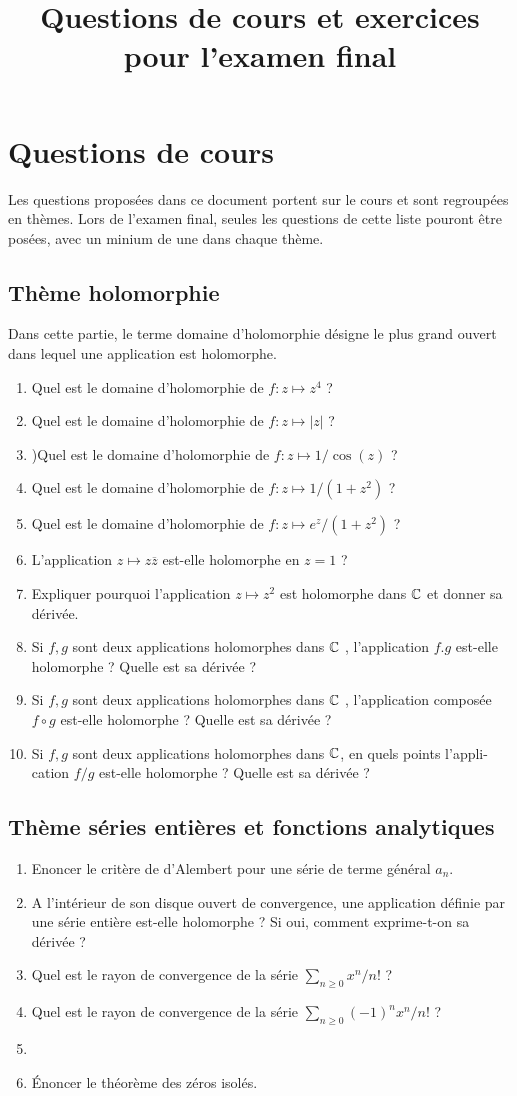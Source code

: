 \documentclass[a4paper, 12pt]{amsart}
\title{Questions de cours et exercices pour l'examen final}
\begin{document}
\maketitle
\section{Questions de cours}
Les questions proposées dans ce document portent sur le cours et sont regroupées en thèmes. Lors de l'examen final, seules les questions de cette liste pouront être
posées, avec un minium de une dans chaque thème.
\subsection{Thème holomorphie}
Dans cette partie, le terme domaine d'holomorphie désigne le plus grand ouvert
dans lequel une application est holomorphe.
\begin{enumerate}
\item Quel est le domaine d'holomorphie de $f : z \mapsto z^4$ ?
\item Quel est le domaine d'holomorphie de $f : z \mapsto |z|$ ?
\item)Quel est le domaine d'holomorphie de $f : z \mapsto 1/ \cos(z)$ ?
\item Quel est le domaine d'holomorphie de $f : z \mapsto 1/(1 + z^2 )$ ?
\item Quel est le domaine d'holomorphie de $f : z \mapsto e^z /(1 + z^2 )$ ?
\item L'application $z \mapsto z\overline{z}$ est-elle holomorphe en $z = 1$ ?
\item Expliquer pourquoi l'application $z \mapsto z^2$ est holomorphe dans $\mathbb{C}$ et donner
sa dérivée.
\item Si $f, g$ sont deux applications holomorphes dans $\mathbb{C}$ , l'application $f.g$ est-elle
holomorphe ? Quelle est sa dérivée ?
\item Si $f, g$ sont deux applications holomorphes dans $\mathbb{C}$ , l'application composée
$f \circ g$ est-elle holomorphe ? Quelle est sa dérivée ?
\item Si $f, g$ sont deux applications holomorphes dans $\mathbb{C}$, en quels points l'appli-
cation $f /g$ est-elle holomorphe ? Quelle est sa dérivée ?
\end{enumerate}
\subsection{Thème séries entières et fonctions analytiques}
\begin{enumerate}
\item Enoncer le critère de d'Alembert pour une série de terme général $a_n$.
\item A l'intérieur de son disque ouvert de convergence, une application définie
par une série entière est-elle holomorphe ? Si oui, comment exprime-t-on sa
dérivée ?
\item Quel est le rayon de convergence de la série $\sum_{n \geq 0} x^n / n!$ ?
\item Quel est le rayon de convergence de la série $\sum_{n \geq 0} (-1)^n x^n / n!$ ?
\item
\item Énoncer le théorème des zéros isolés.
\end{enumerate}
\end{document}

